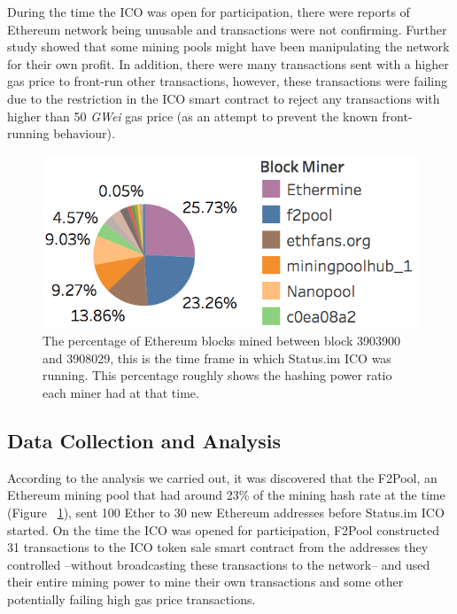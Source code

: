 During the time the ICO was open for participation, there were reports of Ethereum network being unusable and transactions were not confirming. Further study showed that some mining pools might have been manipulating the network for their own profit. In addition, there were many transactions sent with a higher gas price to front-run other transactions, however, these transactions were failing due to the restriction in the ICO smart contract to reject any transactions with higher than 50 \textit{GWei} gas price (as an attempt to prevent the known front-running behaviour).

\begin{figure}[h]
\centering
\includegraphics[width=0.5\linewidth]{figures/Mining_pool_ratio.png}
\caption{The percentage of Ethereum blocks mined between block 3903900 and 3908029, this is the time frame in which Status.im ICO was running. This percentage roughly shows the hashing power ratio each miner had at that time. \label{fig:mining_pool_ratio}} %
\end{figure}

\subsection{Data Collection and Analysis}
According to the analysis we carried out, it was discovered that the F2Pool, an Ethereum mining pool that had around 23\% of the mining hash rate at the time (Figure ~\ref{fig:mining_pool_ratio}), sent 100 Ether to 30 new Ethereum addresses before Status.im ICO started. On the time the ICO was opened for participation, F2Pool constructed 31 transactions to the ICO token sale smart contract from the addresses they controlled --without broadcasting these transactions to the network-- and used their entire mining power to mine their own transactions and some other potentially failing high gas price transactions.

